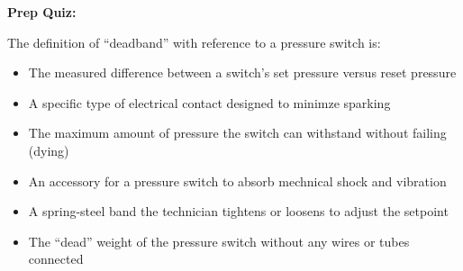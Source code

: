 \vfil \eject

\noindent
{\bf Prep Quiz:}

The definition of ``deadband'' with reference to a pressure switch is:

\begin{itemize}
\item{} The measured difference between a switch's set pressure versus reset pressure
\vskip 5pt 
\item{} A specific type of electrical contact designed to minimze sparking
\vskip 5pt 
\item{} The maximum amount of pressure the switch can withstand without failing (dying)
\vskip 5pt 
\item{} An accessory for a pressure switch to absorb mechnical shock and vibration
\vskip 5pt 
\item{} A spring-steel band the technician tightens or loosens to adjust the setpoint
\vskip 5pt 
\item{} The ``dead'' weight of the pressure switch without any wires or tubes connected
\end{itemize}






